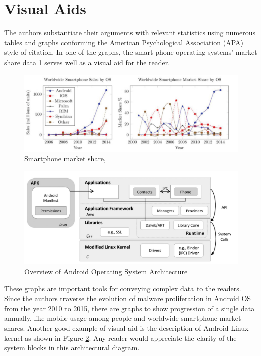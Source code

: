 \documentclass[letterpaper,10pt]{texMemo}
\begin{document}
\section*{Visual Aids}
The authors substantiate their arguments with relevant statistics using numerous tables and graphs conforming the American Psychological Association (APA) style of citation. In one of the graphs, the smart phone operating systems' market share data \ref{lbl_smartphone_market_share} serves well as a visual aid for the reader.
\begin{figure}[h!]
        \centerline{\includegraphics[scale=0.45]{smartphonemarketshare.PNG}}
        \label{lbl_smartphone_market_share}
        \caption{Smartphone market share, ~\cite[fig 1]{Tam:2017:EAM:3022634.3017427}}
\end{figure}
\begin{figure}[h!]
        \centerline{\includegraphics[scale=0.45]{androidlinuxkernel.PNG}}
        \caption{Overview of Android Operating System Architecture ~\cite[fig 2]{Tam:2017:EAM:3022634.3017427}}
        \label{lbl_linux_kernl}
\end{figure}
These graphs are important tools for conveying complex data to the readers. Since the authors traverse the evolution of malware proliferation in Android OS from the year 2010 to 2015, there are graphs to show progression of a single data annually, like mobile usage among people and worldwide smartphone market shares. Another good example of visual aid is the description of Android Linux kernel as shown in Figure \ref{lbl_linux_kernl}. Any reader would appreciate the clarity of the system blocks in this architectural diagram. \\
\end{document}
